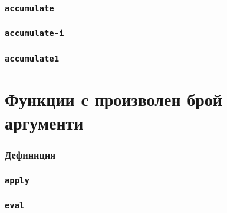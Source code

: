 \documentclass{beamer}
\begin{document}
\begin{frame}
  \frametitle{\tt{accumulate}}
\end{frame}

\begin{frame}
  \frametitle{\tt{accumulate-i}}
\end{frame}

\begin{frame}
  \frametitle{\tt{accumulate1}}
\end{frame}


\section{Функции с произволен брой аргументи}

\begin{frame}
  \frametitle{Дефиниция}
\end{frame}

\begin{frame}
  \frametitle{\tt{apply}}
\end{frame}

\begin{frame}
  \frametitle{\tt{eval}}
\end{frame}
\end{document}
